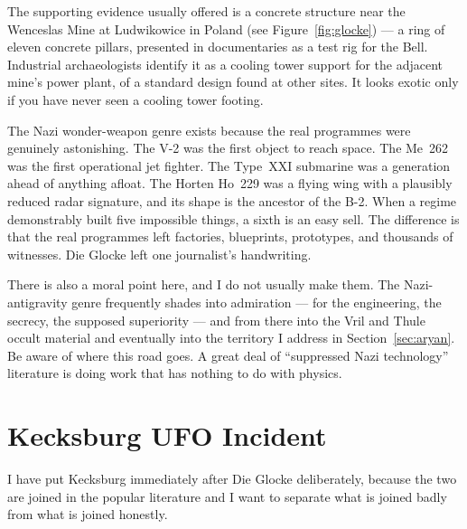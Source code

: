 The supporting evidence usually offered is a concrete structure near the Wenceslas Mine at
Ludwikowice in Poland (see Figure~\ref{fig:glocke}) --- a ring of eleven concrete pillars,
presented in documentaries as a test rig for the Bell. Industrial archaeologists identify it as
a cooling tower support for the adjacent mine's power plant, of a standard design found at other
sites. It looks exotic only if you have never seen a cooling tower footing.

\begin{funfact}
The Nazi wonder-weapon genre exists because the real programmes were genuinely astonishing.
The V-2 was the first object to reach space. The Me~262 was the first operational jet
fighter. The Type~XXI submarine was a generation ahead of anything afloat. The Horten Ho~229
was a flying wing with a plausibly reduced radar signature, and its shape is the ancestor of
the B-2. When a regime demonstrably built five impossible things, a sixth is an easy sell.
The difference is that the real programmes left factories, blueprints, prototypes, and
thousands of witnesses. Die Glocke left one journalist's handwriting.
\end{funfact}

There is also a moral point here, and I do not usually make them. The Nazi-antigravity genre
frequently shades into admiration --- for the engineering, the secrecy, the supposed
superiority --- and from there into the Vril and Thule occult material and eventually into
the territory I address in Section~\ref{sec:aryan}. Be aware of where this road goes. A
great deal of ``suppressed Nazi technology'' literature is doing work that has nothing to do
with physics.

\section{Kecksburg UFO Incident}\label{sec:kecksburg}

I have put Kecksburg immediately after Die Glocke deliberately, because the two are joined in the
popular literature and I want to separate what is joined badly from what is joined honestly.

